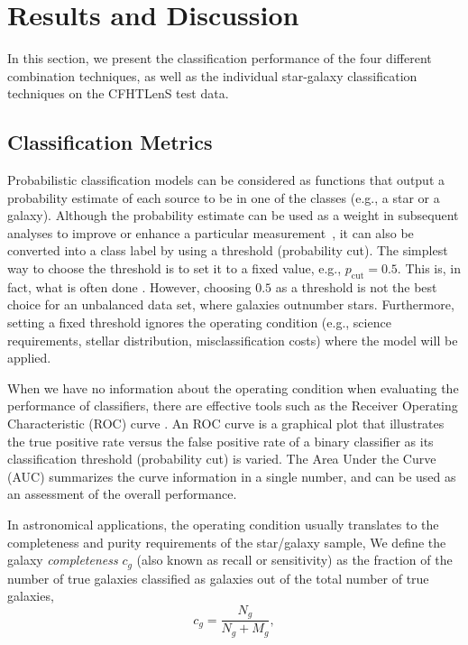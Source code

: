 \documentclass[useAMS,usenatbib]{mn2e}
\newcommand{\eg}{{e.g., }}
\begin{document}
\section{Results and Discussion}
  \label{section:results_and_discussion}

In this section, we present the classification performance of
the four different combination techniques,
as well as the individual star-galaxy classification techniques
on the CFHTLenS test data.


\subsection{Classification Metrics}

Probabilistic classification models can be considered as
functions that output a probability estimate of each source
to be in one of the classes (\eg a star or a galaxy).
Although the probability estimate can be used as a weight 
in subsequent analyses to improve or enhance
a particular measurement~\citep{ross2011ameliorating},
it can also be converted into a class label
by using a threshold (probability cut).
The simplest way to choose the threshold is to set it to a fixed value,
\eg $p_\mathrm{cut} = 0.5$.
This is, in fact, what is often done
\citep[\eg][]{henrion2011bayesian, Fadely2012}.
However, choosing $0.5$ as a threshold is not the best choice
for an unbalanced data set, where galaxies outnumber stars.
Furthermore, setting a fixed threshold ignores the operating condition 
(\eg science requirements, stellar distribution, misclassification costs)
where the model will be applied.


When we have no information about the operating condition
when evaluating the performance of classifiers,
there are effective tools such as
the Receiver Operating Characteristic (ROC) curve
\citep{swets2000better}.
An ROC curve is a graphical plot that illustrates the true positive rate
versus the false positive rate of a binary classifier
as its classification threshold (probability cut) is varied.
The Area Under the Curve (AUC) summarizes the curve information
in a single number,
and can be used as an assessment of the overall performance.

In astronomical applications,
the operating condition usually translates to
the completeness and purity requirements of the star/galaxy sample,
We define the galaxy \textit{completeness}
$c_g$ (also known as recall or sensitivity) as
the fraction of the number of true galaxies classified as galaxies
out of the total number of true galaxies,
\begin{equation}
c_g = \frac{N_g}{N_g + M_g},
\end{equation}
\end{document}
